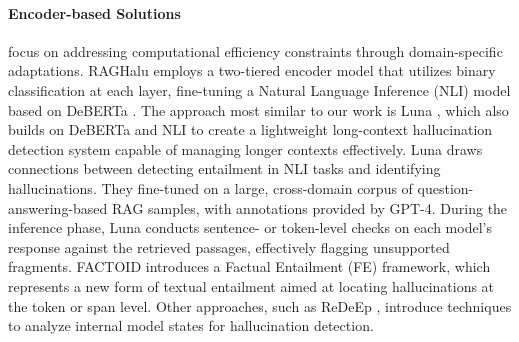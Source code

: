 \paragraph{Encoder-based Solutions} focus on addressing computational efficiency constraints through domain-specific adaptations. RAGHalu \cite{Zimmerman:2024} employs a two-tiered encoder model that utilizes binary classification at each layer, fine-tuning a Natural Language Inference (NLI) model based on DeBERTa \cite{He:2021}. The approach most similar to our work is Luna \cite{Belyi:2025}, which also builds on DeBERTa and NLI to create a lightweight long-context hallucination detection system capable of managing longer contexts effectively. Luna draws connections between detecting entailment in NLI tasks and identifying hallucinations. They fine-tuned on a large, cross-domain corpus of question-answering-based RAG samples, with annotations provided by GPT-4. During the inference phase, Luna conducts sentence- or token-level checks on each model's response against the retrieved passages, effectively flagging unsupported fragments. FACTOID \cite{Rawte:2024} introduces a Factual Entailment (FE) framework, which represents a new form of textual entailment aimed at locating hallucinations at the token or span level. Other approaches, such as ReDeEp \cite{Sun:2025}, introduce techniques to analyze internal model states for hallucination detection.